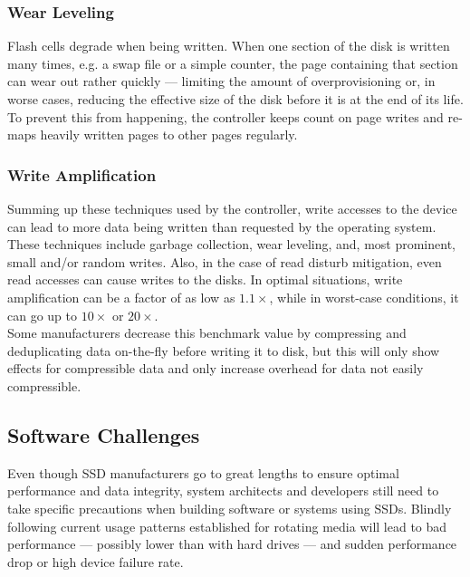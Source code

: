 \documentclass{acm_proc_article-sp}
\begin{document}
\subsubsection*{Wear Leveling}
Flash cells degrade when being written. When one section of the disk is written many times, e.g. a swap file or a simple counter, the page containing that section can wear out rather quickly --- limiting the amount of overprovisioning or, in worse cases, reducing the effective size of the disk before it is at the end of its life. To prevent this from happening, the controller keeps count on page writes and re-maps heavily written pages to other pages regularly.

\subsubsection*{Write Amplification}
Summing up these techniques used by the controller, write accesses to the device can lead to more data being written than requested by the operating system. These techniques include garbage collection, wear leveling, and, most prominent, small and/or random writes.
Also, in the case of read disturb mitigation, even read accesses can cause writes to the disks.
In optimal situations, write amplification can be a factor of as low as $1.1\times$, while in worst-case conditions, it can go up to $10\times$ or $20\times$.
\\
Some manufacturers decrease this benchmark value by compressing and deduplicating data on-the-fly before writing it to disk, but this will only show effects for compressible data and only increase overhead for data not easily compressible.

\subsection{Software Challenges}
Even though SSD manufacturers go to great lengths to ensure optimal performance and data integrity, system architects and developers still need to take specific precautions when building software or systems using SSDs. Blindly following current usage patterns established for rotating media will lead to bad performance --- possibly lower than with hard drives --- and sudden performance drop or high device failure rate.
\end{document}
